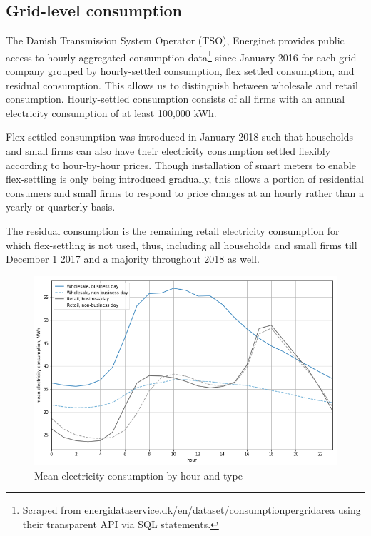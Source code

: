 \subsection{Grid-level consumption}
\label{subsec:d_consumption}
The Danish Transmission System Operator (TSO), Energinet provides public access to hourly aggregated consumption data\footnote{Scraped from \href{https://www.energidataservice.dk/en/dataset/consumptionpergridarea/}{energidataservice.dk/en/dataset/consumptionpergridarea} using their transparent API via SQL statements.} since January 2016 for each grid company grouped by hourly-settled consumption, flex settled consumption, and residual consumption. This allows us to distinguish between wholesale and retail consumption. Hourly-settled consumption consists of all firms with an annual electricity consumption of at least 100,000 kWh.
\par
Flex-settled consumption was introduced in January 2018 such that households and small firms can also have their electricity consumption settled flexibly according to hour-by-hour prices. Though installation of smart meters to enable flex-settling is only being introduced gradually, this allows a portion of residential consumers and small firms to respond to price changes at an hourly rather than a yearly or quarterly basis.
\par
The residual consumption is the remaining retail electricity consumption for which flex-settling is not used, thus, including all households and small firms till December 1 2017 and a majority throughout 2018 as well.
\begin{figure}[H]
  \centering
  \caption{Mean electricity consumption by hour and type}
    \label{fig:cons_hours}
  \includegraphics[width=1 \textwidth]{03_figures/cons_hours}
\end{figure}

